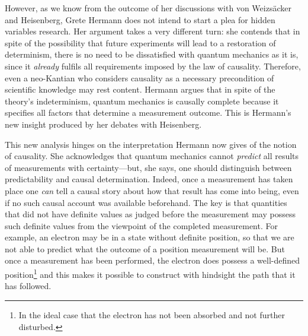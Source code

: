 \documentclass[11pt]{article}
\begin{document}
However, as we know from the outcome of her discussions with von Weizs\"{a}cker and Heisenberg, Grete Hermann does not intend to start a plea for hidden variables research. Her argument takes a very different turn: she contends that in spite of the possibility that future experiments will lead to a restoration of determinism, there is no need to be dissatisfied with quantum mechanics as it is, since it \emph{already} fulfils all requirements imposed by the law of causality. Therefore, even a neo-Kantian who considers causality as a necessary precondition of scientific knowledge may rest content. Hermann argues that in spite of the theory's indeterminism, quantum mechanics is causally complete because it specifies all factors that determine a measurement outcome. This is Hermann's new insight produced by her debates with Heisenberg.

This new analysis hinges on the interpretation Hermann now gives of the notion of causality. She acknowledges that quantum mechanics cannot \emph{predict} all results of measurements with certainty---but, she says, one should distinguish between predictability and causal determination. Indeed, once a measurement has taken place one \emph{can} tell a causal story about how that result has come into being, even if no such causal account was available beforehand. The key is that quantities that did not have definite values as judged before the measurement may possess such definite values from the viewpoint of the completed measurement. For example, an electron may be in a state without definite position, so that we are not able to predict what the outcome of a position measurement will be. But once a measurement has been performed, the electron does possess a well-defined position\footnote{In the ideal case that the electron has not been absorbed and not further disturbed.} and this makes it possible to construct with hindsight the path that it has followed.
\end{document}
